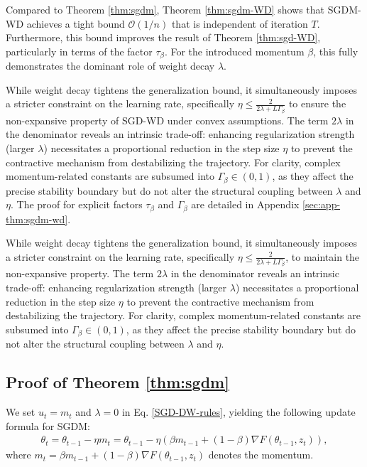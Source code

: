 \begin{remark}
Compared to Theorem \ref{thm:sgdm}, Theorem \ref{thm:sgdm-WD} shows that SGDM-WD achieves a tight bound $\mathcal{O}(1/n)$ that is independent of iteration $T$. Furthermore, this bound improves the result of Theorem \ref{thm:sgd-WD}, particularly in terms of the factor $\tau_{\beta}$. For the introduced momentum $\beta$, this fully demonstrates the dominant role of weight decay $\lambda$.
\end{remark}

\begin{remark}\label{remark 1}
While weight decay tightens the generalization bound, it simultaneously imposes a stricter constraint on the learning rate, specifically $\eta \leq \frac{2}{2\lambda + L\Gamma_{\beta}}$ to ensure the non-expansive property of SGD-WD under convex assumptions. The term $2\lambda$ in the denominator reveals an intrinsic trade-off: enhancing regularization strength (larger $\lambda$) necessitates a proportional reduction in the step size $\eta$ to prevent the contractive mechanism from destabilizing the trajectory. For clarity, complex momentum-related constants are subsumed into $\Gamma_{\beta} \in (0,1)$, as they affect the precise stability boundary but do not alter the structural coupling between $\lambda$ and $\eta$. The proof for explicit factors $\tau_{\beta}$ and $\Gamma_{\beta}$ are detailed in Appendix \ref{sec:app-thm:sgdm-wd}. 
\end{remark}

While weight decay tightens the generalization bound, it simultaneously imposes a stricter constraint on the learning rate, specifically $\eta \leq \frac{2}{2\lambda + L\Gamma_{\beta}}$, to maintain the non-expansive property. The term $2\lambda$ in the denominator reveals an intrinsic trade-off: enhancing regularization strength (larger $\lambda$) necessitates a proportional reduction in the step size $\eta$ to prevent the contractive mechanism from destabilizing the trajectory. For clarity, complex momentum-related constants are subsumed into $\Gamma_{\beta} \in (0,1)$, as they affect the precise stability boundary but do not alter the structural coupling between $\lambda$ and $\eta$.

\subsection{Proof of Theorem \ref{thm:sgdm}}\label{sec:app-thm:sgdm}

We set $u_t = m_t$ and $\lambda=0$ in Eq. \ref{SGD-DW-rules}, yielding the following update formula for SGDM: 
\begin{equation}
  \begin{aligned}
   \theta_t = \theta_{t-1} - \eta m_t = \theta_{t-1} - \eta (\beta m_{t-1}+(1-\beta)\nabla F(\theta_{t-1},z_t)),
  \end{aligned}
 \end{equation}
where $m_t = \beta m_{t-1}+(1-\beta)\nabla F(\theta_{t-1},z_t)$ denotes the momentum.

